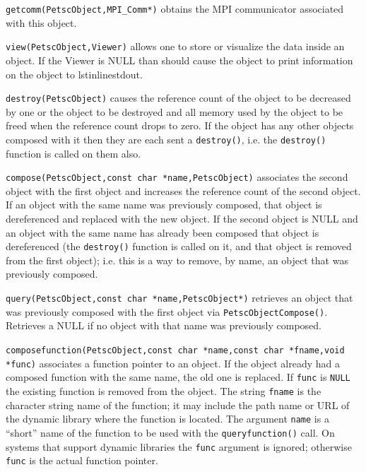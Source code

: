 \begin{tightitemize}
\item \lstinline{getcomm(PetscObject,MPI_Comm*)} obtains the MPI communicator associated
      with this object.

\item \lstinline{view(PetscObject,Viewer)} allows one to store or visualize the data inside
      an object. If the Viewer is NULL than should cause the object to print
      information on the object to lstinline{stdout}.

\item \lstinline{destroy(PetscObject)} causes the reference count of the object to be decreased
      by one or the object to be destroyed and all memory used by the object to be freed when
      the reference count drops to zero.
      If the object has any other objects composed with it then they are each sent a
      \lstinline{destroy()}, i.e. the \lstinline{destroy()} function is called on them also.

\item \lstinline{compose(PetscObject,const char *name,PetscObject)} associates the second object with
      the first object and increases the reference count of the second object. If an
      object with the
      same name was previously composed, that object is dereferenced and replaced with
      the new object. If the
      second object is NULL and an object with the same name has already been
      composed that object is dereferenced (the \lstinline{destroy()} function is called on
      it, and that object is removed from the first object); i.e. this is a way to
      remove, by name, an object that was previously composed.

\item \lstinline{query(PetscObject,const char *name,PetscObject*)} retrieves an object that was
      previously composed with the first object via \lstinline{PetscObjectCompose()}. Retrieves a NULL if no object with
      that name was previously composed.

\item \lstinline{composefunction(PetscObject,const char *name,const char *fname,void *func)} associates a function
      pointer to an object. If the object already had a composed function with the
      same name, the old one is replaced. If \lstinline{func} is \lstinline{NULL} the existing function is removed from
      the object. The string \lstinline{fname} is the character string name of the function;
      it may include the path name or URL of the dynamic library where the function is located.
      The argument \lstinline{name} is a ``short'' name of the function to be used with the
      \lstinline{queryfunction()} call. On systems that support dynamic libraries the \lstinline{func}
      argument is ignored; otherwise \lstinline{func} is the actual function pointer.


\end{tightitemize}
